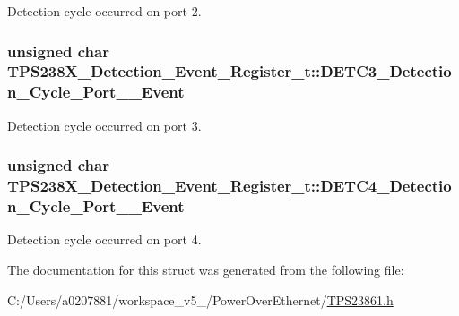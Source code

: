 Detection cycle occurred on port 2. 

\hypertarget{struct_t_p_s238_x___detection___event___register__t_a28041048d9aa8a3c11259d3d17c29bc6}{
\subsubsection[{D\-E\-T\-C3\-\_\-\-Detection\-\_\-\-Cycle\-\_\-\-Port\-\_\-3\-\_\-\-Event}]{\setlength{\rightskip}{0pt plus 5cm}unsigned char T\-P\-S238\-X\-\_\-\-Detection\-\_\-\-Event\-\_\-\-Register\-\_\-t\-::\-D\-E\-T\-C3\-\_\-\-Detection\-\_\-\-Cycle\-\_\-\-Port\-\_\-\_\-\-Event}}\label{struct_t_p_s238_x___detection___event___register__t_a28041048d9aa8a3c11259d3d17c29bc6}


Detection cycle occurred on port 3. 

\hypertarget{struct_t_p_s238_x___detection___event___register__t_aa544d43273d1b5dad75dd742d372c6b4}{
\subsubsection[{D\-E\-T\-C4\-\_\-\-Detection\-\_\-\-Cycle\-\_\-\-Port\-\_\-4\-\_\-\-Event}]{\setlength{\rightskip}{0pt plus 5cm}unsigned char T\-P\-S238\-X\-\_\-\-Detection\-\_\-\-Event\-\_\-\-Register\-\_\-t\-::\-D\-E\-T\-C4\-\_\-\-Detection\-\_\-\-Cycle\-\_\-\-Port\-\_\-\_\-\-Event}}\label{struct_t_p_s238_x___detection___event___register__t_aa544d43273d1b5dad75dd742d372c6b4}


Detection cycle occurred on port 4. 



The documentation for this struct was generated from the following file\-:\begin{DoxyCompactItemize}
\item 
C\-:/\-Users/a0207881/workspace\-\_\-v5\-\_/\-Power\-Over\-Ethernet/\hyperlink{_t_p_s23861_8h}{T\-P\-S23861.\-h}\end{DoxyCompactItemize}
